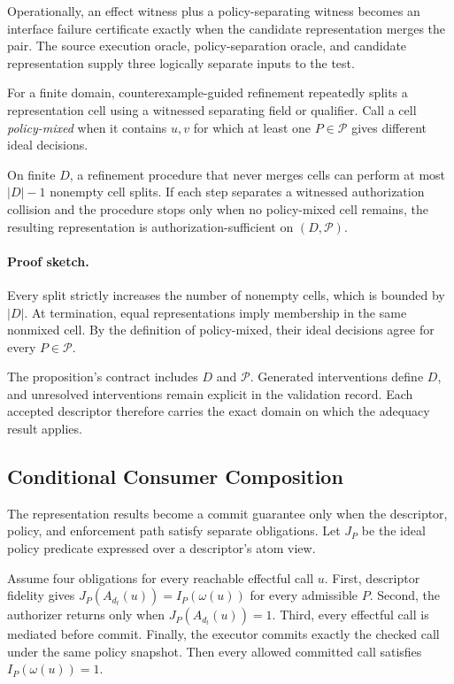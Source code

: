 Operationally, an effect witness plus a policy-separating witness becomes an
interface failure certificate exactly when the candidate representation merges
the pair. The source execution oracle, policy-separation oracle, and candidate representation supply
three logically separate inputs to the test.

For a finite domain, counterexample-guided refinement repeatedly splits a
representation cell using a witnessed separating field or qualifier.  Call a
cell \emph{policy-mixed} when it contains $u,v$ for which at least one
$P\in\mathcal P$ gives different ideal decisions.

\begin{proposition}
\label{thm:finite-adequacy}
On finite $D$, a refinement procedure that never merges cells can perform at
most $|D|-1$ nonempty cell splits.  If each step separates a witnessed
authorization collision and the procedure stops only when no policy-mixed cell
remains, the resulting representation is authorization-sufficient on
$(D,\mathcal P)$.
\end{proposition}

\paragraph{Proof sketch.}
Every split strictly increases the number of nonempty cells, which is bounded
by $|D|$.  At termination, equal representations imply membership in the same
nonmixed cell.  By the definition of policy-mixed, their ideal decisions agree
for every $P\in\mathcal P$.

The proposition's contract includes $D$ and $\mathcal P$. Generated
interventions define $D$, and unresolved interventions remain explicit in the
validation record. Each accepted descriptor therefore carries the exact domain
on which the adequacy result applies.

\subsection{Conditional Consumer Composition}

The representation results become a commit guarantee only when the descriptor,
policy, and enforcement path satisfy separate obligations.  Let $J_P$ be the
ideal policy predicate expressed over a descriptor's atom view.

\begin{proposition}
\label{thm:conditional-atom-mediation}
Assume four obligations for every reachable effectful call $u$.  First,
descriptor fidelity gives $J_P(A_{d_t}(u))=I_P(\omega(u))$ for every admissible
$P$.  Second, the authorizer returns \Allow{} only when
$J_P(A_{d_t}(u))=1$.  Third, every effectful call is mediated before commit.
Finally, the executor commits exactly the checked call under the same policy
snapshot.  Then every allowed committed call satisfies $I_P(\omega(u))=1$.
\end{proposition}

